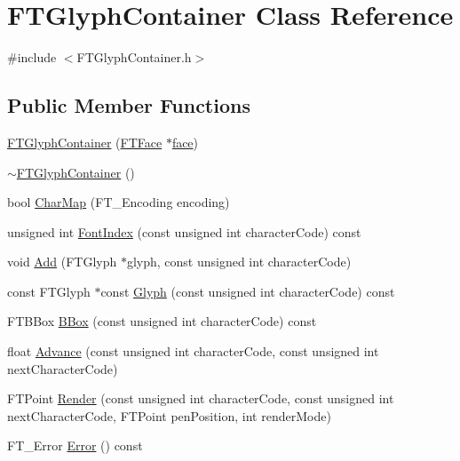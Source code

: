 \hypertarget{class_f_t_glyph_container}{}\section{F\+T\+Glyph\+Container Class Reference}
\label{class_f_t_glyph_container}


{\ttfamily \#include $<$F\+T\+Glyph\+Container.\+h$>$}

\subsection*{Public Member Functions}
\begin{DoxyCompactItemize}
\item 
\hyperlink{class_f_t_glyph_container_a277feb3b5aec44774f34957405f8bd33}{F\+T\+Glyph\+Container} (\hyperlink{class_f_t_face}{F\+T\+Face} $\ast$\hyperlink{class_f_t_glyph_container_afd28a78efbafe6f45e07766f538be143}{face})
\item 
\hyperlink{class_f_t_glyph_container_a37389dc7c5764dbeb97d0e89ca92337a}{$\sim$\+F\+T\+Glyph\+Container} ()
\item 
bool \hyperlink{class_f_t_glyph_container_af733b9a0df70930abc1091571287e820}{Char\+Map} (F\+T\+\_\+\+Encoding encoding)
\item 
unsigned int \hyperlink{class_f_t_glyph_container_a65f816bf2a49eb378a006c17e69455a7}{Font\+Index} (const unsigned int character\+Code) const 
\item 
void \hyperlink{class_f_t_glyph_container_ae8f085d829fce8d00479873058bc5ebe}{Add} (F\+T\+Glyph $\ast$glyph, const unsigned int character\+Code)
\item 
const F\+T\+Glyph $\ast$const \hyperlink{class_f_t_glyph_container_a87feabeda7c963135f5618912f9dd483}{Glyph} (const unsigned int character\+Code) const 
\item 
F\+T\+B\+Box \hyperlink{class_f_t_glyph_container_acb4b272ab8234d70091a3c79a373d4e0}{B\+Box} (const unsigned int character\+Code) const 
\item 
float \hyperlink{class_f_t_glyph_container_ab57f99b48c5991558284bd85504291b1}{Advance} (const unsigned int character\+Code, const unsigned int next\+Character\+Code)
\item 
F\+T\+Point \hyperlink{class_f_t_glyph_container_a4c3f9e0cd676f07a249a6dc18bea5d05}{Render} (const unsigned int character\+Code, const unsigned int next\+Character\+Code, F\+T\+Point pen\+Position, int render\+Mode)
\item 
F\+T\+\_\+\+Error \hyperlink{class_f_t_glyph_container_a4b0b0368c93f3db09d6fcadaddde2a18}{Error} () const 
\end{DoxyCompactItemize}
